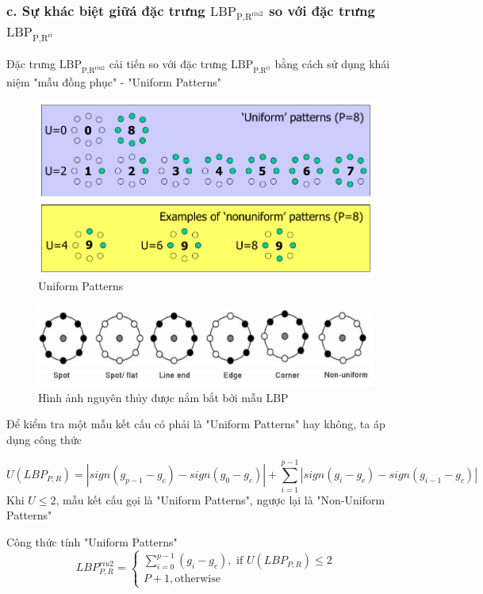 \documentclass{article}
\begin{document}
	
	\subsubsection{c. Sự khác biệt giữá đặc trưng $\text{LBP}_{\text{P,R}^{\text{riu2}}}$ so với đặc trưng $\text{LBP}_{\text{P,R}^{\text{ri}}}$}
	Đặc trưng $\text{LBP}_{\text{P,R}^{\text{riu2}}}$ cải tiến so với đặc trưng $\text{LBP}_{\text{P,R}^{\text{ri}}}$ bằng cách sử dụng khái niệm "mẫu đồng phục" - "Uniform Patterns"
	
	\begin{figure}[H]
		\centering
		\includegraphics[width=0.75\linewidth]{images/lbp_uniform_2.png}
		\caption{Uniform Patterns}
		\label{fig:writing-thesis}
	\end{figure}

	\begin{figure}[H]
		\centering
		\includegraphics[width=0.75\linewidth]{images/lbp_uniform_types.png}
		\caption{Hình ảnh nguyên thủy được nắm bắt bởi mẫu LBP}
		\label{fig:writing-thesis}
	\end{figure}
	
	Để kiểm tra một mẫu kết cấu có phải là "Uniform Patterns" hay không, ta áp dụng công thức
	
	\begin{equation}
		U(LBP_{P,R}) = |sign(g_{p-1} - g_c) - sign(g_0 - g_c)| + \sum_{i=1}^{p-1}|sign(g_i - g_c) - sign(g_{i-1} - g_c)|
	\end{equation}
	Khi $U \leq 2$, mẫu kết cấu gọi là "Uniform Patterns", ngược lại là "Non-Uniform Patterns"
	
	Công thức tính "Uniform Patterns"
	\begin{equation}
		LBP_{P, R}^{riu2} = \begin{cases}\sum_{i=0}^{p-1}(g_i - g_c), \text{ if } U(LBP_{P, R}) \leq 2\\P+1, \text{otherwise}\end{cases}
	\end{equation}
\end{document}
